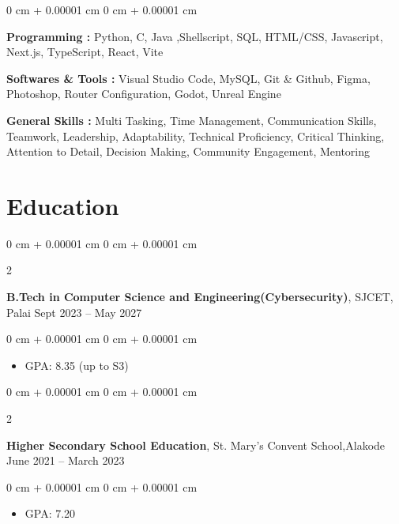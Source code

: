 \documentclass[10pt, letterpaper]{article}
\newenvironment{highlights}{
    \begin{itemize}[
        topsep=0.10 cm,
        parsep=0.10 cm,
        partopsep=0pt,
        itemsep=0pt,
        leftmargin=0 cm + 10pt
    ]
}{
    \end{itemize}
} %
\newenvironment{onecolentry}{
    \begin{adjustwidth}{
        0 cm + 0.00001 cm
    }{
        0 cm + 0.00001 cm
    }
}{
    \end{adjustwidth}
} %
\newenvironment{twocolentry}[2][]{
    \onecolentry
    \def\secondColumn{#2}
    \setcolumnwidth{\fill, 4.5 cm}
    \begin{paracol}{2}
}{
    \switchcolumn \raggedleft \secondColumn
    \end{paracol}
    \endonecolentry
} %
\begin{document}
    \begin{onecolentry}
        
        \textbf{Programming :} Python, C, Java ,Shellscript, SQL, HTML/CSS, Javascript, Next.js, TypeScript, React, Vite 

        \vspace{0.2 cm}

        \textbf{Softwares \& Tools :} Visual Studio Code, MySQL, Git \& Github, Figma, Photoshop, Router Configuration, Godot, Unreal Engine

        \vspace{0.2 cm}

        \textbf{General Skills :}  Multi Tasking, Time Management, Communication Skills, Teamwork, Leadership, Adaptability, Technical Proficiency, Critical Thinking, Attention to Detail, Decision Making, Community Engagement, Mentoring
        
    \end{onecolentry}

    \section{Education}



        
        \begin{twocolentry}{
            Sept 2023 – May 2027
        }
            \textbf{B.Tech in Computer Science and Engineering(Cybersecurity)},   SJCET, Palai\end{twocolentry}

        \vspace{0.10 cm}
        \begin{onecolentry}
            \begin{highlights}
                \item GPA: 8.35 (up to S3)
            \end{highlights}
        \end{onecolentry}

         \begin{twocolentry}{
            June 2021 – March 2023
        }
        
            \textbf{Higher Secondary School Education}, St. Mary's Convent School,Alakode\end{twocolentry}

        \vspace{0.10 cm}
        \begin{onecolentry}
            \begin{highlights}
                \item GPA: 7.20
            \end{highlights}
        \end{onecolentry}
\end{document}
